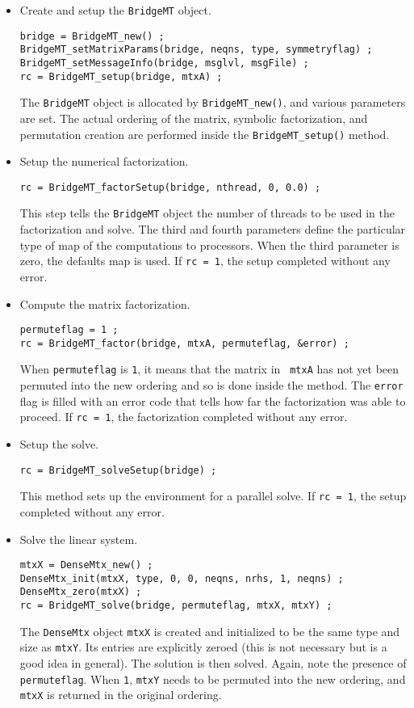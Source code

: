 \begin{itemize}
%
\item Create and setup the {\tt BridgeMT} object.
\begin{verbatim}
bridge = BridgeMT_new() ;
BridgeMT_setMatrixParams(bridge, neqns, type, symmetryflag) ;
BridgeMT_setMessageInfo(bridge, msglvl, msgFile) ;
rc = BridgeMT_setup(bridge, mtxA) ;
\end{verbatim}
The {\tt BridgeMT} object is allocated by {\tt BridgeMT\_new()},
and various parameters are set.
The actual ordering of the matrix, symbolic factorization,
and permutation creation are performed inside the {\tt BridgeMT\_setup()}
method.
%
\item Setup the numerical factorization.
\begin{verbatim}
rc = BridgeMT_factorSetup(bridge, nthread, 0, 0.0) ;
\end{verbatim}
This step tells the \texttt{BridgeMT} object the number of threads
to be used in the factorization and solve.
The third and fourth parameters define the particular type 
of map of the computations to processors.
When the third parameter is zero, the defaults map is used.
If {\tt rc = 1}, the setup completed without any error.
%
\item Compute the matrix factorization.
\begin{verbatim}
permuteflag = 1 ;
rc = BridgeMT_factor(bridge, mtxA, permuteflag, &error) ;
\end{verbatim}
When {\tt permuteflag} is {\tt 1}, it means that the matrix in {\tt
mtxA} has not yet been permuted into the new ordering and so is
done inside the method.
The {\tt error} flag is filled with an error code that tells how far the
factorization was able to proceed.
If {\tt rc = 1}, the factorization completed without any error.
%
\item Setup the solve.
\begin{verbatim}
rc = BridgeMT_solveSetup(bridge) ;
\end{verbatim}
This method sets up the environment for a parallel solve.
If {\tt rc = 1}, the setup completed without any error.
%
\item Solve the linear system.
\begin{verbatim}
mtxX = DenseMtx_new() ;
DenseMtx_init(mtxX, type, 0, 0, neqns, nrhs, 1, neqns) ;
DenseMtx_zero(mtxX) ;
rc = BridgeMT_solve(bridge, permuteflag, mtxX, mtxY) ;
\end{verbatim}
The {\tt DenseMtx} object {\tt mtxX} is created and initialized to be
the same type and size as {\tt mtxY}.
Its entries are explicitly zeroed (this is not necessary but is a good
idea in general).
The solution is then solved.
Again, note the presence of {\tt permuteflag}.
When {\tt 1}, \texttt{mtxY} needs to be permuted into the new ordering,
and \texttt{mtxX} is returned in the original ordering.
\end{itemize}
\par
